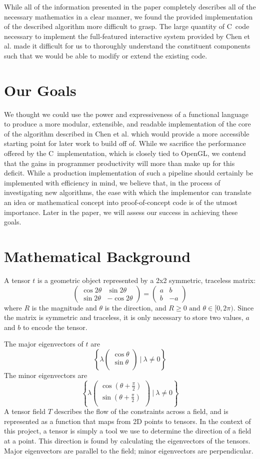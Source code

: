 \documentclass[twocolumn]{article}
\newcommand{\sqmat}[4]{\ensuremath{
    \left(\begin{array}{cc}
        #1 & #2 \\
        #3 & #4
    \end{array}\right)}}
\newcommand{\mkvec}[2]{\ensuremath{
    \left(\begin{array}{c}
        #1 \\
        #2 \\
    \end{array}\right)}}
\def \cpp {C\nolinebreak[4]\hspace{-.05em}\raisebox{.4ex}{\tiny\bf ++}~}
\begin{document}
While all of the information presented in the paper completely describes all of
the necessary mathematics in a clear manner,
we found the provided implementation of the described
algorithm more difficult to grasp. The large quantity of \cpp code necessary to
implement the full-featured interactive system provided by Chen et al. made it
difficult for us to thoroughly understand the constituent components such that
we would be able to modify or extend the existing code.

\section{Our Goals}
We thought we could use the power and expressiveness of a functional language
to produce a more modular, extensible, and readable implementation of the core
of the algorithm described in Chen et al. which would provide a more
accessible starting point for later work to build off of. While we sacrifice
the performance offered by the \cpp implementation, which is closely tied to
OpenGL, we contend that the gains in programmer productivity will more than
make up for this deficit. While a production implementation of such a pipeline
should certainly be implemented with efficiency in mind, we believe that, in
the process of investigating new algorithms, the ease with which the
implementor can translate an idea or mathematical concept into proof-of-concept
code is of the utmost importance. Later in the paper, we will assess our
success in achieving these goals.

\section{Mathematical Background}
\label{sec:math}
A tensor $t$ is a geometric object represented by a 2x2 symmetric, traceless
matrix:
\[
    \sqmat{\cos{2\theta}}{\sin{2\theta}}{\sin{2\theta}}{-\cos{2\theta}}
    = \sqmat{a}{b}{b}{-a}
\]
where $R$ is the magnitude and $\theta$ is the direction, and
$R\geq0 \textrm{ and } \theta\in[0,2\pi)$. Since the matrix is symmetric and
traceless, it is only necessary to store two values, $a$ and $b$ to encode
the tensor.

The major eigenvectors of $t$ are
\[
    \left\{
        \lambda\mkvec{\cos{\theta}}{\sin{\theta}} ~|~ \lambda \neq 0
    \right\}
\]
The minor eigenvectors are
\[
    \left\{
        \lambda\mkvec
                {\cos{(\theta+\frac{\pi}{2})}}
                {\sin{(\theta+\frac{\pi}{2})}}
        ~|~ \lambda \neq 0
    \right\}
\]
A tensor field $T$ describes the flow of the constraints across a field,
and is represented as a function that maps from 2D points to tensors. In the
context of this project, a tensor is simply a tool we use to determine the
direction of a field at a point. This direction is found by calculating the
eigenvectors of the tensors. Major eigenvectors are parallel to the field;
minor eigenvectors are perpendicular.
\end{document}
